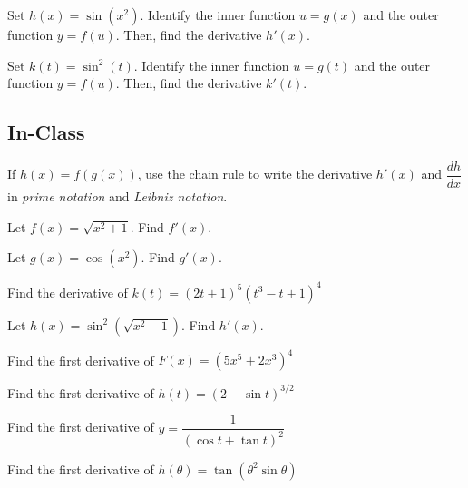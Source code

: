 \documentclass[notes]{subfiles}
\begin{document}
		\begin{ex}
			Set $h(x) = \sin (x^2)$.  Identify the inner function $u = g(x)$ and the outer function $y = f(u)$.  Then, find the derivative $h'(x)$.
		\end{ex}
			
		\begin{ex}
			Set $k(t) = \sin^2(t)$.  Identify the inner function $u = g(t)$ and the outer function $y = f(u)$.  Then, find the derivative $k'(t)$.
		\end{ex}
			\newpage
			
	\subsection*{In-Class}	
		\begin{question}
			If $h(x) = f(g(x))$, use the chain rule to write the derivative $h'(x)$ and $\dfrac{dh}{dx}$ in \emph{prime notation} and \emph{Leibniz notation}.
		\end{question}
			
		\begin{ex}
			Let $f(x) = \sqrt{x^2 + 1}$.  Find $f'(x)$.
		\end{ex}
			
		\begin{ex}
			Let $g(x) = \cos (x^2)$.  Find $g'(x)$.
		\end{ex}
			
		\begin{ex}
			Find the derivative of $k(t) = (2t+1)^5(t^3-t+1)^4$
		\end{ex}
			\newpage
			
		\begin{ex}
			Let $h(x) = \sin^2(\sqrt{x^2-1})$.  Find $h'(x)$.
		\end{ex}
			
		\begin{ex}
			Find the first derivative of $F(x) = (5x^5+2x^3)^4$
		\end{ex}
			
		\begin{ex}
			Find the first derivative of $h(t) = (2-\sin t)^{3/2}$
		\end{ex}
			
		\begin{ex}
			Find the first derivative of $y=\dfrac{1}{(\cos t + \tan t)^2}$
		\end{ex}
			\newpage
		\begin{ex}
			Find the first derivative of $h(\theta) = \tan (\theta^2\sin\theta)$
		\end{ex}
			
\end{document}

